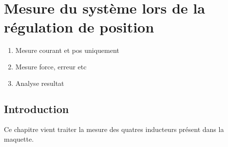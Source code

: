 \chapter{Mesure du système lors de la régulation de position}

\begin{enumerate}
    \item Mesure courant et pos uniquement
    \item Mesure force, erreur etc
    \item Analyse resultat
\end{enumerate}

\section{Introduction}
Ce chapitre vient traiter la mesure des quatres inducteurs présent dans la maquette.
